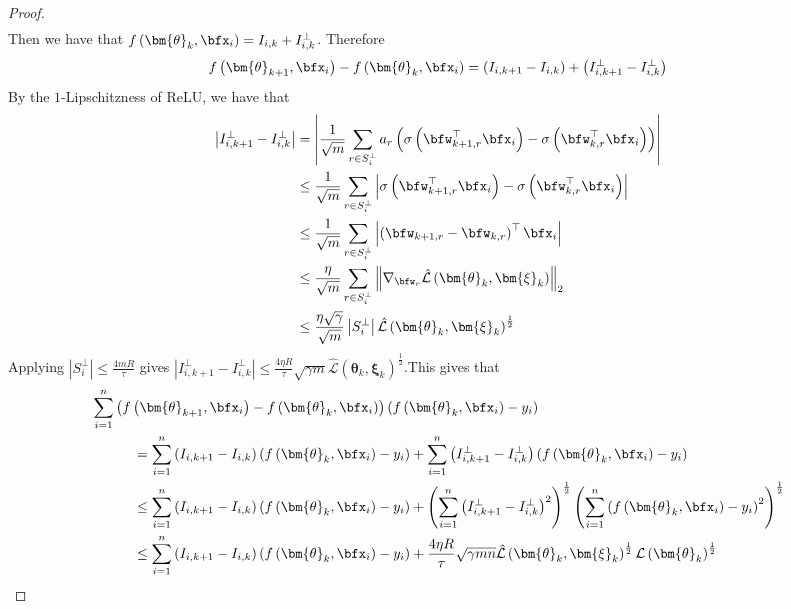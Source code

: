 \documentclass[10pt]{article} %
\theoremstyle{definition}
\theoremstyle{plain}
\newcommand{\paren}[1]{\left(#1\right)}
\newcommand{\norm}[1]{\left\|#1\right\|}
\def\calL{{\mathcal{L}}}
\begin{document}
\begin{proof}
\begin{align*}
    \end{align*}
    Then we have that $f\paren{\bm{\theta}_k,\bfx_i} = I_{i,k} + I_{i,k}^\perp$. Therefore
    \[
        f\paren{\bm{\theta}_{k+1},\bfx_i} - f\paren{\bm{\theta}_k,\bfx_i} = \paren{I_{i,k+1} - I_{i,k}} + \paren{I_{i,k+1}^\perp - I_{i,k}^\perp}
    \]
    By the $1$-Lipschitzness of ReLU, we have that
    \begin{align*}
        \left|I_{i,k+1}^\perp - I_{i,k}^\perp\right| & = \left|\frac{1}{\sqrt{m}}\sum_{r\in S_i^\perp}a_r\paren{\sigma\paren{\bfw_{k+1,r}^\top\bfx_i} - \sigma\paren{\bfw_{k,r}^\top\bfx_i}}\right|\\
        & \leq \frac{1}{\sqrt{m}}\sum_{r\in S_i^\perp}\left|\sigma\paren{\bfw_{k+1,r}^\top\bfx_i} - \sigma\paren{\bfw_{k,r}^\top\bfx_i}\right|\\
        & \leq \frac{1}{\sqrt{m}}\sum_{r\in S_i^\perp}\left|\paren{\bfw_{k+1,r}-\bfw_{k,r}}^\top\bfx_i\right|\\
        & \leq \frac{\eta}{\sqrt{m}}\sum_{r\in S_i^\perp}\norm{\nabla_{\bfw_r}\hat{\calL}\paren{\bm{\theta}_k,\bm{\xi}_k}}_2\\
        & \leq \frac{\eta\sqrt{\gamma}}{\sqrt{m}}\left|S_i^\perp\right|\hat{\calL}\paren{\bm{\theta}_k,\bm{\xi}_k}^{\frac{1}{2}}
    \end{align*}
    Applying $\left|S_i^\perp\right|\leq \frac{4mR}{\tau}$ gives $\left|I_{i,k+1}^\perp - I_{i,k}^\perp\right| \leq \frac{4\eta R}{\tau}\sqrt{\gamma m}\hat{\calL}\paren{\bm{\theta}_k,\bm{\xi}_k}^{\frac{1}{2}}$.This gives that
    \begin{equation}
        \label{eq:thm_conv_proof_4}
        \begin{aligned}
            & \sum_{i=1}^n\paren{f\paren{\bm{\theta}_{k+1},\bfx_i} - f\paren{\bm{\theta}_k,\bfx_i}}\paren{f\paren{\bm{\theta}_k,\bfx_i} - y_i}\\
            & \quad\quad\quad = \sum_{i=1}^n\paren{I_{i,k+1} - I_{i,k}}\paren{f\paren{\bm{\theta}_k,\bfx_i} - y_i} + \sum_{i=1}^n\paren{I_{i,k+1}^\perp - I_{i,k}^\perp}\paren{f\paren{\bm{\theta}_k,\bfx_i} - y_i}\\
            & \quad\quad\quad\leq \sum_{i=1}^n\paren{I_{i,k+1} - I_{i,k}}\paren{f\paren{\bm{\theta}_k,\bfx_i} - y_i} + \paren{\sum_{i=1}^n\paren{I_{i,k+1}^\perp - I_{i,k}^\perp}^2}^{\frac{1}{2}}\paren{\sum_{i=1}^n\paren{f\paren{\bm{\theta}_k,\bfx_i} - y_i}^2}^{\frac{1}{2}}\\
            & \quad\quad\quad \leq \sum_{i=1}^n\paren{I_{i,k+1} - I_{i,k}}\paren{f\paren{\bm{\theta}_k,\bfx_i} - y_i} + \frac{4\eta R}{\tau}\sqrt{\gamma mn}\hat{\calL}\paren{\bm{\theta}_k,\bm{\xi}_k}^{\frac{1}{2}}\calL\paren{\bm{\theta}_k}^{\frac{1}{2}}

\end{aligned}
\end{equation}
\end{proof}
\end{document}
